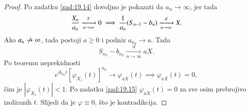 \begin{proof}
    Po zadatku \ref{zad:19.14} dovoljno je pokazati da $a_n \to \infty$, jer tada
    \begin{equation*}
        \frac{X_n}{a_n} \xrightarrow[n \to \infty]{\mathbb{P}} 0 \implies \frac{1}{a_n} (S_{n - 1} - b_n) \xrightarrow[n \to \infty]{d} X.
    \end{equation*}
    Ako $a_n \centernot\to \infty$, tada postoji $a \geq 0$ i podniz $a_{n_k} \to a$.
    Tada
    \begin{equation*}
        S_{n_k} - b_{n_k} \xrightarrow[n \to \infty]{d} a X.
    \end{equation*}
    Po teoremu neprekidnosti
    \begin{equation*}
        e^{i b_{n_k} t} [\varphi_{X_1} (t)]^{n_k} \to \varphi_{a X} (t) \implies \varphi_{a X} (t) = 0,
    \end{equation*}
    \v cim je $|\varphi_{X_1} (t)| < 1$.
    Po zadatku \ref{zad:19.15} $\varphi_{a X} (t) = 0$ za sve osim prebrojivo izoliranih $t$.
    Slijedi da je $\varphi \equiv 0$, \v sto je kontradikcija.
\end{proof}